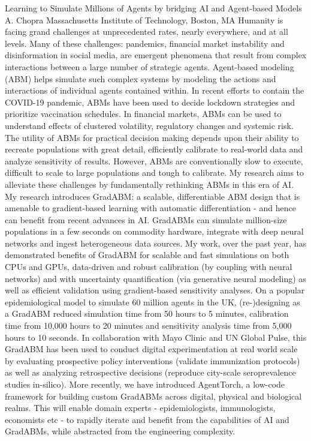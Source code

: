 
    \begin{abstract_online}{Learning to Simulate Millions of Agents by bridging AI and Agent-based Models}{%
        A. Chopra}{%
        }{%
        Massachusetts Institute of Technology, Boston, MA}
    Humanity is facing grand challenges at unprecedented rates, nearly everywhere, and at all levels. Many of these challenges: pandemics, financial market instability and disinformation in social media, are emergent phenomena that result from complex interactions between a large number of strategic agents. Agent-based modeling (ABM) helps simulate such complex systems by modeling the actions and interactions of individual agents contained within. In recent efforts to contain the COVID-19 pandemic, ABMs have been used to decide lockdown strategies and prioritize vaccination schedules. In financial markets, ABMs can be used to understand effects of clustered volatility, regulatory changes and systemic risk. The utility of ABMs for practical decision making depends upon their ability to recreate populations with great detail, efficiently calibrate to real-world data and analyze sensitivity of results. However, ABMs are conventionally slow to execute, difficult to scale to large populations and tough to calibrate. My research aims to alleviate these challenges by fundamentally rethinking ABMs in this era of AI. My research introduces GradABM: a scalable, differentiable ABM design that is amenable to gradient-based learning with automatic differentiation - and hence can benefit from recent advances in AI. GradABMs can simulate million-size populations in a few seconds on commodity hardware, integrate with deep neural networks and ingest heterogeneous data sources. My work, over the past year, has demonstrated benefits of GradABM for scalable and fast simulations on both CPUs and GPUs, data-driven and robust calibration (by coupling with neural networks) and with uncertainty quantification (via generative neural modeling) as well as efficient validation using gradient-based sensitivity analyses. On a popular epidemiological model to simulate 60 million agents in the UK, (re-)designing as a GradABM reduced simulation time from 50 hours to 5 minutes, calibration time from 10,000 hours to 20 minutes and sensitivity analysis time from 5,000 hours to 10 seconds. In collaboration with Mayo Clinic and UN Global Pulse, this GradABM has been used to conduct digital experimentation at real world scale by evaluating prospective policy interventions (validate immunization protocols) as well as analyzing retrospective decisions (reproduce city-scale seroprevalence studies in-silico). More recently, we have introduced AgentTorch, a low-code framework for building custom GradABMs across digital, physical and biological realms. This will enable domain experts - epidemiologists, immunologists, economists etc - to rapidly iterate and benefit from the capabilities of AI and GradABMs, while abstracted from the engineering complexity.  
    
    \end{abstract_online}
    